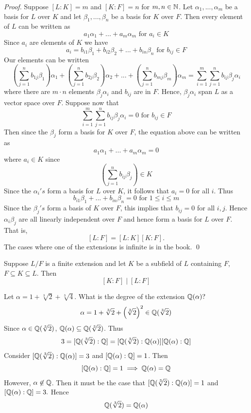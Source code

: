 \begin{proof}
    Suppose $[L : K] = m$ and $[K : F] = n$ for $m,n \in \mathbb{N}$. Let $\alpha_1, ..., \alpha_m$ be a basis for $L$ over $K$ and let $\beta_1, ..., \beta_n$ be a basis for $K$ over $F$. Then every element of $L$ can be written as 
    $$a_1\alpha_1 + ... + a_m\alpha_m \text{ for } a_i\in K$$
    Since $a_i$ are elements of $K$ we have
    $$a_i = b_{i1}\beta_1 + b_{i2}\beta_2 + ... + b_{in}\beta_n \text{ for } b_{ij} \in F$$
    Our elements can be written
    $$\left(\sum_{j=1}^{n}b_{1j}\beta_1\right)\alpha_1 + \left(\sum_{j=1}^{n}b_{2j}\beta_2\right)\alpha_2+...+\left(\sum_{j=1}^{n}b_{mj}\beta_m\right)\alpha_m = \sum_{i=1}^{m}\sum_{j=1}^{n}b_{ij}\beta_j\alpha_i$$
    where there are $m\cdot n$ elements $\beta_j\alpha_i$ and $b_{ij}$ are in $F$. Hence, $\beta_j\alpha_i$ span $L$ as a vector space over $F$.
    Suppose now that
    $$\sum_{i=1}^{m}\sum_{j=1}^{n}b_{ij}\beta_j\alpha_i = 0 \text{ for } b_{ij} \in F$$
    Then since the $\beta_j$ form a basis for $K$ over $F$, the equation above can be written as
    $$a_1\alpha_1 + ... + a_m \alpha_m = 0$$
    where $a_i \in K$ since
    $$\left(\sum_{j=1}^{n}b_{ij}\beta_j\right) \in K$$
    Since the $\alpha_i's$ form a basis for $L$ over $K$, it follows that $a_i = 0$ for all $i$. Thus
    $$b_{i1}\beta_1 + ... + b_{in}\beta_n = 0 \text{ for } 1 \leq i \leq m$$
    Since the $\beta_j's$ form a basis of $K$ over $F$, this implies that $b_{ij} = 0$ for all $i,j$. Hence $\alpha_i\beta_j$ are all linearly independent over $F$ and hence form a basis for $L$ over $F$. That is,
    $$[L : F] = [L : K][K : F].$$
    The cases where one of the extensions is infinite is in the book.
    \qed
\end{proof}

\begin{corollary}
    Suppose $L/F$ is a finite extension and let $K$ be a subfield of $L$ containing $F$, $F\subseteq K \subseteq L$. Then 
    $$[K : F] \mid [L : F]$$
\end{corollary}

\begin{example}
    Let $\alpha = 1 + \sqrt[3]{2} + \sqrt[3]{4}$. What is the degree of the extension $\mathbb{Q}(\alpha)?$
    $$\alpha = 1 + \sqrt[3]{2} + \left(\sqrt[2]{2}\right)^2 \in \mathbb{Q}(\sqrt[3]{2})$$
    Since $\alpha \in \mathbb{Q}(\sqrt[3]{2})$, $\mathbb{Q}(\alpha) \subseteq \mathbb{Q}(\sqrt[3]{2})$. Thus
    $$3 = [\mathbb{Q}(\sqrt[3]{2}):\mathbb{Q}] = [\mathbb{Q}(\sqrt[3]{2}) : \mathbb{Q}(\alpha)][\mathbb{Q}(\alpha) : \mathbb{Q}]$$
    Consider $[\mathbb{Q}(\sqrt[3]{2}):\mathbb{Q}(\alpha)]=3$ and $[\mathbb{Q}(\alpha) : \mathbb{Q}] = 1$. Then
    $$[\mathbb{Q}(\alpha) : \mathbb{Q}] = 1 \implies \mathbb{Q}(\alpha) = \mathbb{Q}$$
    However, $\alpha \not \in \mathbb{Q}$. Then it must be the case that $[\mathbb{Q}(\sqrt[3]{2}) : \mathbb{Q}(\alpha)] = 1$ and $[\mathbb{Q}(\alpha) : \mathbb{Q}] = 3.$ Hence
    $$\mathbb{Q}(\sqrt[3]{2}) = \mathbb{Q}(\alpha)$$
\end{example}

